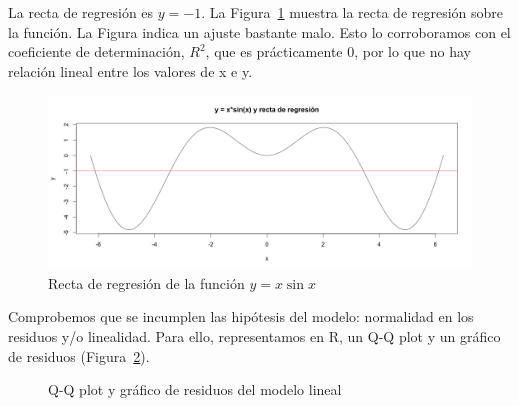 \documentclass[12pt,a4paper,twoside,openright,titlepage,final]{article}
\begin{document}
La recta de regresión es $y=-1$. La Figura~\ref{fig:recta} muestra la recta de regresión sobre la función. La Figura indica un ajuste bastante malo. Esto lo corroboramos con el coeficiente de determinación, $R^2$, que es prácticamente 0, por lo que no hay relación lineal entre los valores de x e y.\\ 

\begin{figure}[tbph!]
\centering
\includegraphics[width=0.8\linewidth]{imagenes/recta}
\caption{Recta de regresión de la función $y=x\sin x$}
\label{fig:recta}
\end{figure}

Comprobemos que se incumplen las hipótesis del modelo: normalidad en los residuos y/o linealidad. Para ello, representamos en R, un Q-Q plot y un gráfico de residuos (Figura~\ref{fig:residuos}).\\

\begin{figure}[htbp!]
\centering
{}
\caption{Q-Q plot y gráfico de residuos del modelo lineal} \label{fig:residuos}
\end{figure}
\end{document}
